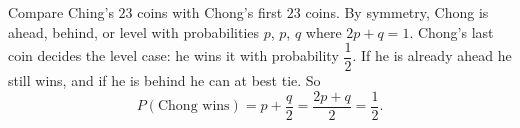 Compare Ching's $23$ coins with Chong's first $23$ coins. By symmetry, Chong is ahead, behind, or level with probabilities $p$, $p$, $q$ where $2p+q=1$. Chong's last coin decides the level case: he wins it with probability $\dfrac{1}{2}$. If he is already ahead he still wins, and if he is behind he can at best tie. So
\[P(\text{Chong wins})=p+\dfrac {q}{2}=\dfrac{2p+q}{2}=\boxed{\dfrac{1}{2}}.\]
